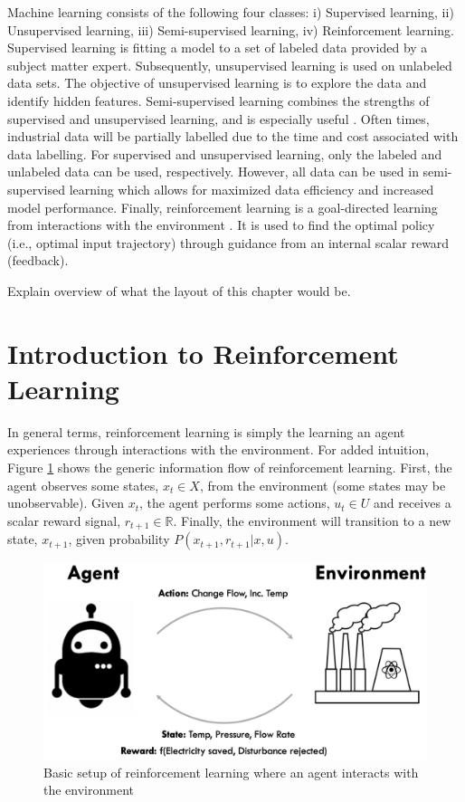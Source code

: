 \hspace{5mm} Machine learning consists of the following four classes: i) Supervised learning, ii) Unsupervised learning, iii) Semi-supervised learning, iv) Reinforcement learning.  Supervised learning is fitting a model to a set of labeled data provided by a subject matter expert.  Subsequently, unsupervised learning is used on unlabeled data sets.  The objective of unsupervised learning is to explore the data and identify hidden features. Semi-supervised learning combines the strengths of supervised and unsupervised learning, and is especially useful \cite{machine_learning}.  Often times, industrial data will be partially labelled due to the time and cost associated with data labelling.  For supervised and unsupervised learning, only the labeled and unlabeled data can be used, respectively.  However, all data can be used in semi-supervised learning which allows for maximized data efficiency and increased model performance. Finally, reinforcement learning is a goal-directed learning from interactions with the environment \cite{sutton}. It is used to find the optimal policy (i.e., optimal input trajectory) through guidance from an internal scalar reward (feedback).  

Explain overview of what the layout of this chapter would be.


\section{Introduction to Reinforcement Learning}

In general terms, reinforcement learning is simply the learning an agent experiences through interactions with the environment.  For added intuition, Figure \ref{fig: simple_rl} shows the generic information flow of reinforcement learning. First, the agent observes some states, $x_t \in X$, from the environment (some states may be unobservable).  Given $x_t$, the agent performs some actions, $u_t \in U$ and receives a scalar reward signal, $r_{t+1} \in \mathbb{R}$.  Finally, the environment will transition to a new state, $x_{t+1}$, given probability $P(x_{t+1}, r_{t+1} | x, u)$.

\begin{figure}[h]
    \centering
    \includegraphics[scale=0.5]{images/RL.png}
    \caption{Basic setup of reinforcement learning where an agent interacts with the environment}
    \label{fig: simple_rl}

\end{figure}

